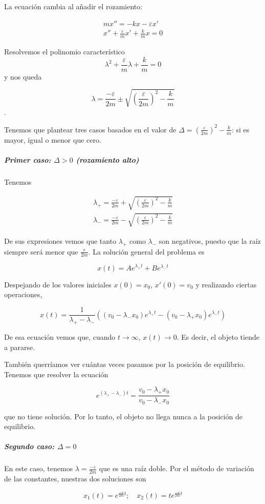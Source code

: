La ecuación cambia al añadir el rozamiento:

\begin{gather} mx'' = -kx - εx' \nonumber \\
x'' + \frac{ε}{m}x' + \frac{k}{m}x = 0
\end{gather}

Resolvemos el polinomio característico \[ λ^2 + \frac{ε}{m}λ + \frac{k}{m} = 0 \] y nos queda

\[ λ = \frac{-ε}{2m} \pm \sqrt{\left(\frac{ε}{2m}\right)^2 - \frac{k}{m}} \].

Tenemos que plantear tres casos basados en el valor de $Δ =\left(\frac{ε}{2m}\right)^2 - \frac{k}{m}$: si es mayor, igual o menor que cero.

\subparagraph{Primer caso: $Δ > 0$ (rozamiento alto)}

Tenemos 

\begin{gather*}
λ_+ = \frac{-ε}{2m} + \sqrt{\left(\frac{ε}{2m}\right)^2 - \frac{k}{m}} \\
λ_- = \frac{-ε}{2m} - \sqrt{\left(\frac{ε}{2m}\right)^2 - \frac{k}{m}} 
\end{gather*}

De sus expresiones vemos que tanto $λ_+$ como $λ_-$ son negativos, puesto que la raíz siempre será menor que $\frac{\epsilon}{2m}$. La solución general del problema es 

\[ x(t) = Ae^{λ_+t} + Be^{λ_-t} \]

Despejando de los valores iniciales $x(0) = x_0$, $x'(0) = v_0$ y realizando ciertas operaciones,

\[ x(t) = \frac{1}{λ_+ - λ_-}\left((v_0-λ_-x_0)e^{λ_+t} - (v_0-λ_+x_0)e^{λ_-t}\right) \]

De esa ecuación vemos que, cuando $t\to ∞$, $x(t) \to 0$. Es decir, el objeto tiende a pararse.

También querríamos ver cuántas veces pasamos por la posición de equilibrio. Tenemos que resolver la ecuación

\[ e^{(λ_+ - λ_-)t} = \frac{v_0-λ_+x_0}{v_0-λ_-x_0} \]

que no tiene solución. Por lo tanto, el objeto no llega nunca a la posición de equilibrio.

\subparagraph{Segundo caso: $Δ=0$}

En este caso, tenemos $λ=\frac{-ε}{2m}$ que es una raíz doble. Por el método de variación de las constantes, nuestras dos soluciones son

\[ x_1(t) = e^{\frac{-ε}{2m}t};\quad x_2(t) = te^{\frac{-ε}{2m}t} \]

